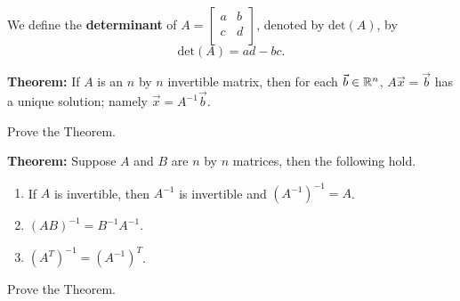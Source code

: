 \begin{enumerate}
\begin{defn}
We define the {\bf determinant} of $A=\begin{bmatrix} a & b \\ c & d\\ \end{bmatrix}$, denoted by $\text{det}(A)$, by $$\text{det}(A)=ad-bc.$$
\end{defn}

{\bf Theorem:} If $A$ is an $n$ by $n$ invertible matrix, then for each $\vec{b}\in \mathbb{R}^n$, $A\vec{x}=\vec{b}$ has a unique solution; namely $\vec{x}=A^{-1}\vec{b}$.

\Problem Prove the Theorem.

\vfill

\newpage

{\bf Theorem:} Suppose $A$ and $B$ are $n$ by $n$ matrices, then the following hold. 
\begin{enumerate}
\item If $A$ is invertible, then $A^{-1}$ is invertible and $(A^{-1})^{-1}=A$.
\item $(AB)^{-1}=B^{-1} A^{-1}$.
\item $(A^{T})^{-1}=(A^{-1})^{T}$.
\end{enumerate}

\Problem Prove the Theorem.

 

\end{enumerate}

